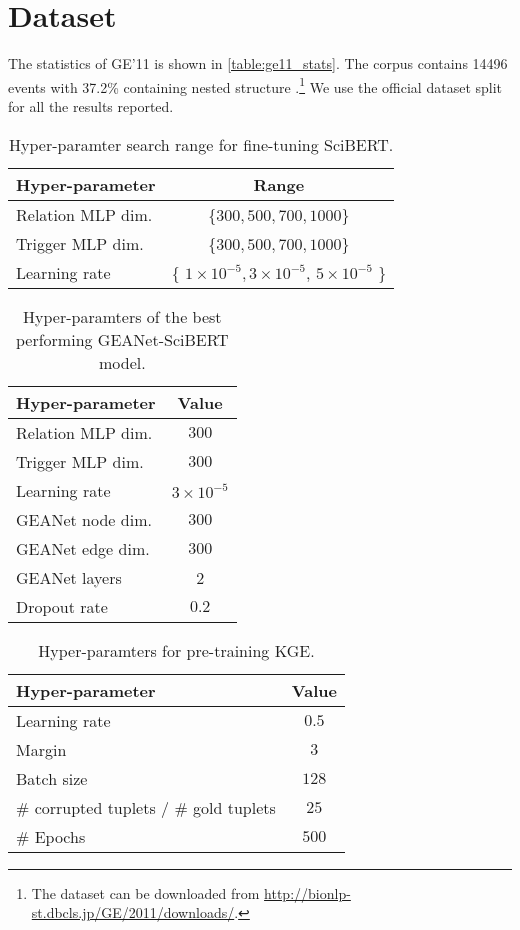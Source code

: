 \documentclass[11pt,a4paper]{article}
\newcommand{\GAENet}{\textrm{GEANet}}
\newcommand{\GE}{\textrm{{\fontfamily{qcr}\selectfont GE'11} }}
\begin{document}
\section{Dataset}
The statistics of \GE is shown in \ref{table:ge11_stats}. The corpus contains 14496 events with 37.2\% containing nested structure \cite{bjorne-salakoski-2011-generalizing}.\footnote{The dataset can be downloaded from \href{http://bionlp-st.dbcls.jp/GE/2011/downloads/}{http://bionlp-st.dbcls.jp/GE/2011/downloads/}.} We use the official dataset split for all the results reported.
\begin{table}[h] 
\small
\centering
\begin{tabular}{lc}
\hline 
\textbf{Hyper-parameter}  & \textbf{Range} \\ \hline
Relation MLP dim. & \{$300, 500, 700, 1000$\} \\
Trigger MLP dim. & \{$300, 500, 700, 1000$\} \\
Learning rate & \{ $1 \times 10^{-5}, 3 \times 10^{-5}$, $5 \times 10^{-5}$ \} \\


\hline
\end{tabular}
\caption{\label{font-table} Hyper-paramter search range for fine-tuning SciBERT.}
\label{table:hyperparameter}
\end{table}

\begin{table}[t]
\small
\centering
\begin{tabular}{lc}
\hline 
\textbf{Hyper-parameter}  & \textbf{Value} \\ \hline
Relation MLP dim. & $300$ \\
Trigger MLP dim. & $300$ \\
Learning rate &  $3 \times 10^{-5}$ \\
\GAENet{} node dim. & $300$ \\
\GAENet{} edge dim. & $300$ \\
\GAENet{} layers & 2 \\
Dropout rate & $0.2$ \\

\hline
\end{tabular}
\caption{\label{font-table} Hyper-paramters of the best performing \GAENet-SciBERT model.}
\label{table:hyperparameter_best}
\end{table}

\begin{table}[t]
\small
\centering
\begin{tabular}{lc}
\hline 
\textbf{Hyper-parameter}  & \textbf{Value} \\ \hline

Learning rate &  $0.5$ \\
Margin & $3$\\
Batch size & $128$ \\
\# corrupted tuplets / \# gold tuplets & $25$\\
\# Epochs & $500$ \\


\hline
\end{tabular}
\caption{\label{font-table} Hyper-paramters for pre-training KGE.}
\label{table:kge_hyper_parameter}
\end{table}
\end{document}
